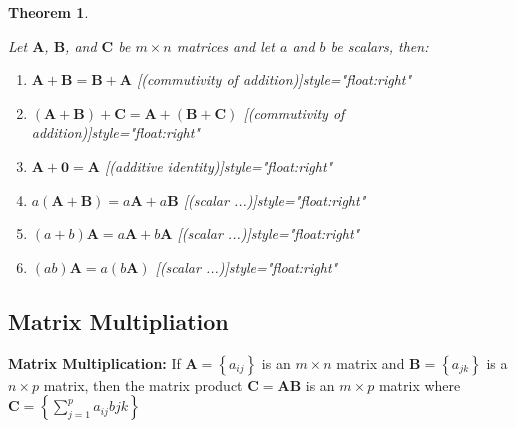 \documentclass[
]{book}
\newtheorem{theorem}{Theorem}[chapter]
\theoremstyle{definition}
\theoremstyle{definition}
\theoremstyle{definition}
\theoremstyle{remark}
\begin{document}
\begin{theorem}
\protect\hypertarget{thm:unlabeled-div-73}{}\label{thm:unlabeled-div-73}

Let \(\mathbf{A}\), \(\mathbf{B}\), and \(\mathbf{C}\) be \(m \times n\) matrices and let \(a\) and \(b\) be scalars, then:

\begin{enumerate}
\def\labelenumi{\arabic{enumi})}
\item
  \(\mathbf{A} + \mathbf{B} = \mathbf{B} + \mathbf{A}\) \hfill [(commutivity of addition)]{style="float:right"}
\item
  \((\mathbf{A} + \mathbf{B}) + \mathbf{C} = \mathbf{A} + (\mathbf{B} + \mathbf{C})\) \hfill [(commutivity of addition)]{style="float:right"}
\item
  \(\mathbf{A} + \mathbf{0} = \mathbf{A}\) \hfill [(additive identity)]{style="float:right"}
\item
  \(a (\mathbf{A} + \mathbf{B}) = a \mathbf{A} + a \mathbf{B}\) \hfill [(scalar ...)]{style="float:right"}
\item
  \((a + b)\mathbf{A} = a \mathbf{A} + b \mathbf{A}\) \hfill [(scalar ...)]{style="float:right"}
\item
  \((ab)\mathbf{A} = a (b\mathbf{A})\) \hfill [(scalar ...)]{style="float:right"}
\end{enumerate}

\end{theorem}

\hypertarget{matrix-multipliation}{%
\subsection{Matrix Multipliation}\label{matrix-multipliation}}

\textbf{Matrix Multiplication:} If \(\mathbf{A} = \left\{ a_{ij} \right\}\) is an \(m \times n\) matrix and \(\mathbf{B} = \left\{ a_{jk} \right\}\) is a \(n \times p\) matrix, then the matrix product \(\mathbf{C} = \mathbf{A} \mathbf{B}\) is an \(m \times p\) matrix where \(\mathbf{C} = \left\{ \sum_{j=1}^p a_{ij} b{jk} \right\}\)
\end{document}
